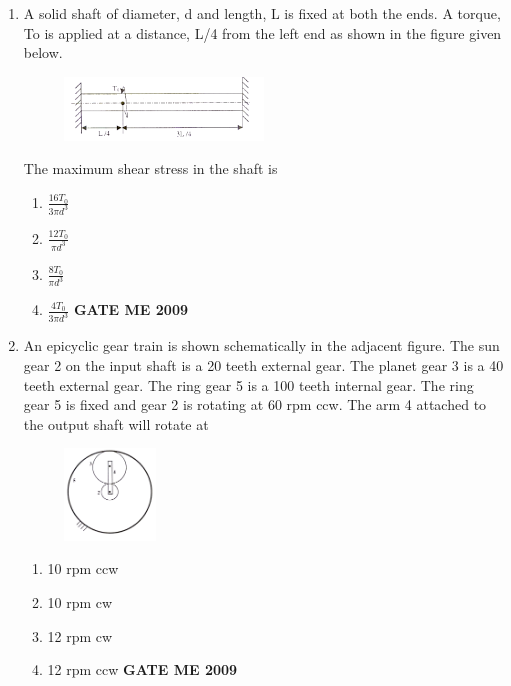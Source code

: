 \documentclass[journal]{IEEEtran}
\begin{document}
\begin{enumerate}[leftmargin=0pt]
\item A solid shaft of diameter, d and length, L is fixed at both the ends. A torque, To is applied at a distance,
L/4 from the left end as shown in the figure given below.


\begin{figure}[h]
  \centering
  \includegraphics[width=0.5\textwidth]{Figs/image (7).png}
\end{figure}

The maximum shear stress in the shaft is

\begin{enumerate}[label=(\Alph*)]
  \item $\frac{16T_0}{3\pi d^3}$
  \item $\frac{12T_0}{\pi d^3}$
  \item $\frac{8T_0}{\pi d^3}$
  \item $\frac{4T_0}{3\pi d^3}$
\hfill{\textbf{GATE ME 2009}}
\end{enumerate}




\item An epicyclic gear train is shown schematically in the adjacent figure. The sun gear 2 on the input shaft is a 20 teeth external gear. The planet gear 3 is a 40 teeth external gear. The ring gear 5 is a 100 teeth internal gear. The ring gear 5 is fixed and gear 2 is rotating at 60 rpm ccw. The arm 4 attached to the output shaft will rotate at
\begin{figure}[h] 
  \centering
  \includegraphics[width=0.23\textwidth]{Figs/image (8).png}
\end{figure}

\begin{enumerate}[label=(\Alph*)]
  \item 10 rpm ccw
  \item 10 rpm cw
  \item 12 rpm cw
  \item 12 rpm ccw
\hfill{\textbf{GATE ME 2009}}
\end{enumerate}


\end{enumerate}
\end{document}

